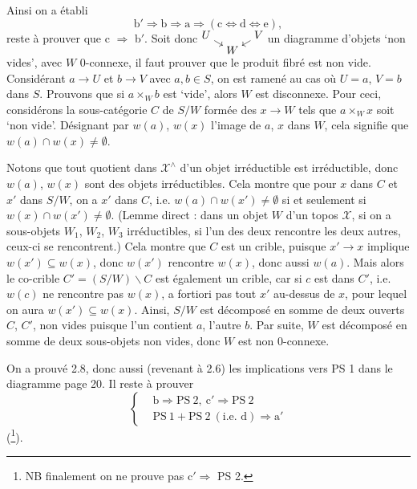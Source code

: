 \documentclass[11pt]{article}
\newcommand{\printedpage}[1]{\marginpar{\footnotesize p.~#1}}
\newcommand{\msp}[1]{\marginpar{\footnotesize [#1]}}
\newcommand{\X}{\mathscr{X}}
\begin{document}
Ainsi on a établi
\[
\mathrm{b}'\Longrightarrow\mathrm{b}\Longrightarrow\mathrm{a}\Longrightarrow(\mathrm{c}\Longleftrightarrow\mathrm{d}\Longleftrightarrow\mathrm{e}),
\]
reste à prouver que c $\Longrightarrow$ b$'$. Soit donc $\begin{tikzcd}[cramped, row sep=0.1em, column sep=0.8em, baseline=(current bounding box.center)] U \arrow[dr] & & V \arrow[dl] \\ & W & \end{tikzcd}$ un diagramme d'objets `non vides', avec $W$ 0-connexe, il faut prouver que le produit fibré est non vide. Considérant $a\longrightarrow U$ et $b\longrightarrow V$ avec $a,b\in S$, on est ramené au cas où $U=a$, $V=b$ dans $S$. Prouvons que si $a\times_W b$ est `vide', alors $W$ est disconnexe. Pour ceci, considérons la sous-catégorie $C$ de $S/W$ formée des $x\longrightarrow W$ tels que $a\times_W x$ soit `non vide'. Désignant par $w(a)$, $w(x)$ l'image de $a$, $x$ dans $W$, cela signifie que $w(a)\cap w(x)\neq\emptyset$.

\msp{page 23}Notons que tout quotient dans $\X^\wedge$ d'un objet irréductible est irréductible, donc $w(a)$, $w(x)$ sont des objets irréductibles. Cela montre que pour $x$ dans $C$ et $x'$ dans $S/W$, on a $x'$ dans $C$, i.e. $w(a)\cap w(x')\neq\emptyset$ si et seulement si $w(x)\cap w(x')\neq\emptyset$. (Lemme direct : dans un objet $W$ d'un topos $\X$, si on a sous-objets $W_1$, $W_2$, $W_3$ irréductibles, si l'un des deux rencontre les deux autres, ceux-ci se rencontrent.) Cela montre que $C$ est un crible, puisque $x'\longrightarrow x$ implique $w(x')\subseteq w(x)$, donc $w(x')$ rencontre $w(x)$, donc aussi $w(a)$. Mais alors le co-crible $C'=(S/W)\backslash C$ est également un crible, car si $c$
\printedpage{15}
est dans $C'$, i.e. $w(c)$ ne rencontre pas $w(x)$, a fortiori pas tout $x'$ au-dessus de $x$, pour lequel on aura $w(x')\subseteq w(x)$. Ainsi, $S/W$ est décomposé en somme de deux ouverts $C$, $C'$, non vides puisque l'un contient $a$, l'autre $b$. Par suite, $W$ est décomposé en somme de deux sous-objets non vides, donc $W$ est non 0-connexe.

On a prouvé 2.8, donc aussi (revenant à 2.6) les implications vers PS 1 dans le diagramme page 20. Il reste à prouver
\[
\left\{
\begin{aligned}
&\mathrm{b}\Longrightarrow\mathrm{PS}\ 2,\ \mathrm{c}'\Longrightarrow\mathrm{PS}\ 2\\
&\mathrm{PS}\ 1+\mathrm{PS}\ 2\ (\text{i.e. d})\Longrightarrow\mathrm{a}'
\end{aligned}
\right.
\]
(\footnote[32]{NB finalement on ne prouve pas c$'\Longrightarrow$ PS 2.}).
\end{document}
